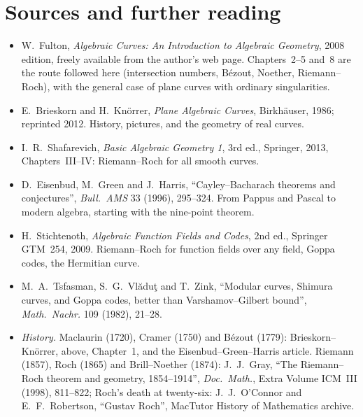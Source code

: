 \section*{Sources and further reading}

\begin{itemize}
\item W.~Fulton, \emph{Algebraic Curves: An Introduction to Algebraic Geometry}, 2008 edition, freely available from the author's web page. Chapters~2--5 and~8
are the route followed here (intersection numbers, B\'ezout, Noether, Riemann--Roch), with the general case of plane curves with ordinary singularities.
\item E.~Brieskorn and H.~Kn\"orrer, \emph{Plane Algebraic Curves}, Birkh\"auser, 1986; reprinted 2012. History, pictures, and the geometry of real curves.
\item I.~R.~Shafarevich, \emph{Basic Algebraic Geometry 1}, 3rd ed., Springer, 2013, Chapters~III--IV: Riemann--Roch for all smooth curves.
\item D.~Eisenbud, M.~Green and J.~Harris, ``Cayley--Bacharach theorems and conjectures'', \emph{Bull.\ AMS} 33 (1996), 295--324. From Pappus and Pascal to modern
algebra, starting with the nine-point theorem.
\item H.~Stichtenoth, \emph{Algebraic Function Fields and Codes}, 2nd ed., Springer GTM~254, 2009. Riemann--Roch for function fields over any field, Goppa
codes, the Hermitian curve.
\item M.~A.~Tsfasman, S.~G.~Vl\u{a}du\c{t} and T.~Zink, ``Modular curves, Shimura curves, and Goppa codes, better than Varshamov--Gilbert bound'',
\emph{Math.\ Nachr.} 109 (1982), 21--28.
\item \emph{History.} Maclaurin (1720), Cramer (1750) and B\'ezout (1779): Brieskorn--Kn\"orrer, above, Chapter~1, and
the Eisenbud--Green--Harris article. Riemann (1857), Roch (1865) and Brill--Noether (1874): J.~J.~Gray, ``The
Riemann--Roch theorem and geometry, 1854--1914'', \emph{Doc.\ Math.}, Extra Volume ICM~III (1998), 811--822; Roch's
death at twenty-six: J.~J.~O'Connor and E.~F.~Robertson, ``Gustav Roch'', MacTutor History of Mathematics archive.
\end{itemize}
